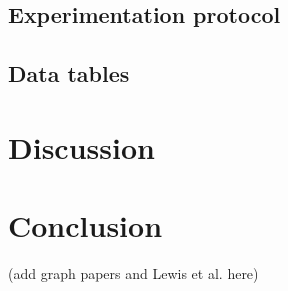 \documentclass{scrartcl}
\begin{document}
\subsection{Experimentation protocol}

\subsection{Data tables}

\section{Discussion}

\section{Conclusion}


(add graph papers and Lewis et al. here)
\end{document}
